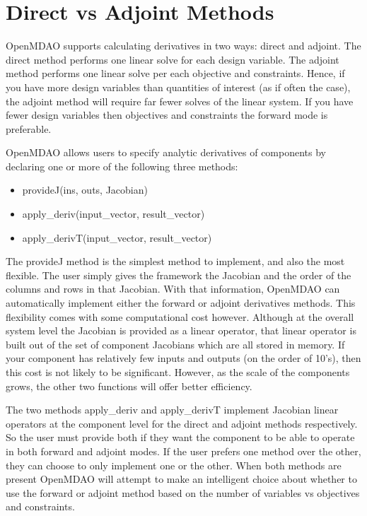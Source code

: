 \documentclass[]{aiaa-tc} %
\begin{document}
    \section{Direct vs Adjoint Methods}

    OpenMDAO supports calculating derivatives in two ways: direct and adjoint. The direct method performs
    one linear solve for each design variable. The adjoint method performs one linear solve per each objective 
    and constraints. Hence, if you have more design variables than quantities of interest (as if often the case), 
    the adjoint method will require far fewer solves of the linear system. If you have fewer design variables then 
    objectives and constraints the forward mode is preferable. 

    OpenMDAO allows users to specify analytic derivatives of components by declaring one or more of the following three
    methods: 

    \begin{itemize}
        \item provideJ(ins, outs, Jacobian)
        \item apply\_deriv(input\_vector, result\_vector)
        \item apply\_derivT(input\_vector, result\_vector)
    \end{itemize}
    
    The provideJ method is the simplest method to implement, and also the most flexible. The user simply gives the framework the 
    Jacobian and the order of the columns and rows in that Jacobian. With that information, OpenMDAO can automatically 
    implement either the forward or adjoint derivatives methods. This flexibility comes with some computational cost however. 
    Although at the overall system level the Jacobian is provided as a linear operator, that linear operator is built out 
    of the set of component Jacobians which are all stored in memory. If your component has relatively few inputs and outputs 
    (on the order of 10's), then this cost is not likely to be significant. However, as the scale of the components grows, 
    the other two functions will offer better efficiency. 

    The two methods apply\_deriv and apply\_derivT implement Jacobian linear operators at 
    the component level for the direct and adjoint methods respectively. So the user must provide both if they 
    want the component to be able to operate in both forward and adjoint modes. If the user prefers one method over 
    the other, they can choose to only implement one or the other. When both methods are present OpenMDAO will 
    attempt to make an intelligent choice about whether to use the forward or adjoint method based on the number 
    of variables vs objectives and constraints. 
\end{document}
